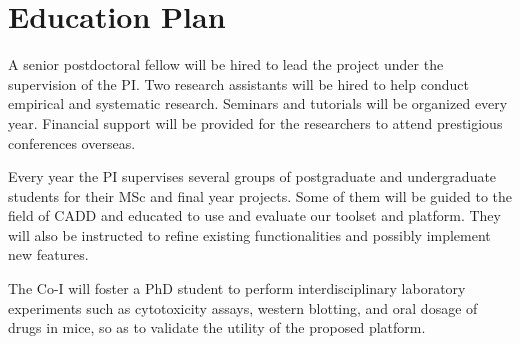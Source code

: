\documentclass[a4paper,12pt]{article}
\begin{document}

\section*{Education Plan}

A senior postdoctoral fellow will be hired to lead the project under the supervision of the PI. Two research assistants will be hired to help conduct empirical and systematic research. Seminars and tutorials will be organized every year. Financial support will be provided for the researchers to attend prestigious conferences overseas.

Every year the PI supervises several groups of postgraduate and undergraduate students for their MSc and final year projects. Some of them will be guided to the field of CADD and educated to use and evaluate our toolset and platform. They will also be instructed to refine existing functionalities and possibly implement new features.

The Co-I will foster a PhD student to perform interdisciplinary laboratory experiments such as cytotoxicity assays, western blotting, and oral dosage of drugs in mice, so as to validate the utility of the proposed platform.

\newpage
\linespread{0.5}
\footnotesize



\end{document}
